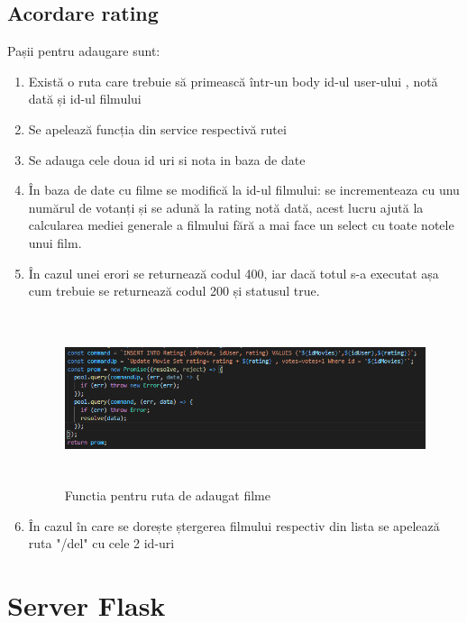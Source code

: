 \subsection{Acordare rating}
\par Pașii pentru adaugare sunt:
\begin{enumerate}
  	\item Există o ruta care trebuie să primească într-un body id-ul user-ului , notă dată și id-ul filmului
  	\item Se apelează funcția din service respectivă rutei
	\item Se adauga cele doua id uri si nota in baza de date 
	\item În baza de date cu filme se modifică la id-ul filmului: se incrementeaza cu unu numărul de votanți și se adună la rating notă dată, acest lucru ajută la calcularea mediei generale a filmului fără a mai face un select cu toate notele unui film.
  	\item În cazul unei erori se returnează codul 400, iar dacă totul s-a executat așa cum trebuie se returnează codul 200 și statusul true.
		\begin{figure}[htbp]
			\centerline{\includegraphics[width=15cm, height=5cm]{figures/functie rating.png}}
			\caption{Functia pentru ruta de adaugat filme}
			\label{fig}
		\end{figure}	
	\item  În cazul în care se dorește ștergerea filmului respectiv din lista se apelează ruta "/del" cu cele 2 id-uri
\end{enumerate}

\section{Server Flask}
\label{sec:ch5sec1}

